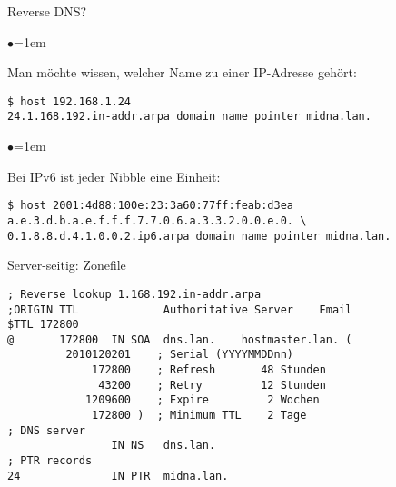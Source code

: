 \documentclass[xetex,serif,compress]{beamer}
\begin{document}
\newcommand{\mslide}[2]{
    \begin{frame}{#1}
        \begin{list}{$\bullet$}{\itemsep=2em}
            #2
        \end{list}
    \end{frame}
}


\begin{frame}[fragile]{Reverse DNS?}
    \begin{list}{$\bullet$}{\itemsep=1em}
        \item Man möchte wissen, welcher Name zu einer IP-Adresse gehört:
    \end{list}

    \begin{verbatim}
$ host 192.168.1.24
24.1.168.192.in-addr.arpa domain name pointer midna.lan.
    \end{verbatim}

    \begin{list}{$\bullet$}{\itemsep=1em}
        \item Bei IPv6 ist jeder Nibble eine Einheit:
    \end{list}

    \begin{verbatim}
$ host 2001:4d88:100e:23:3a60:77ff:feab:d3ea   
a.e.3.d.b.a.e.f.f.f.7.7.0.6.a.3.3.2.0.0.e.0. \
0.1.8.8.d.4.1.0.0.2.ip6.arpa domain name pointer midna.lan.
    \end{verbatim}
\end{frame}

\begin{frame}[fragile]{Server-seitig: Zonefile}
    \begin{lstlisting}[basicstyle=\small\ttfamily]
; Reverse lookup 1.168.192.in-addr.arpa
;ORIGIN TTL             Authoritative Server    Email
$TTL 172800
@       172800  IN SOA  dns.lan.    hostmaster.lan. (
         2010120201    ; Serial (YYYYMMDDnn)
             172800    ; Refresh       48 Stunden
              43200    ; Retry         12 Stunden
            1209600    ; Expire         2 Wochen
             172800 )  ; Minimum TTL    2 Tage
; DNS server
                IN NS   dns.lan.
; PTR records
24              IN PTR  midna.lan.
    \end{lstlisting}
\end{frame}
\end{document}
